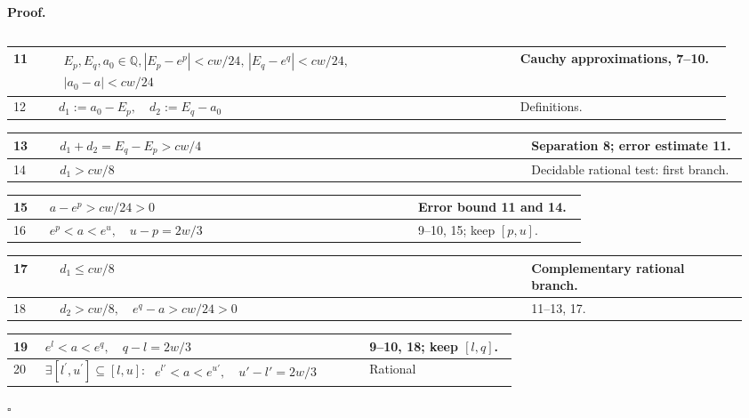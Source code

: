 \documentclass[11pt,reqno]{amsart}
\theoremstyle{redplain}
\renewcommand{\qedsymbol}{\textcolor{proofqed}{\ensuremath{\square}}}
\renewenvironment{proof}[1][Proof]{\par\noindent\textbf{\textcolor{proofhead}{#1.}}\par\nobreak}{\par\nobreak\hfill\qedsymbol}
\numberwithin{equation}{section}
\begin{document}
\begin{proof}
\begin{tabular}{|@{}p{0.06\linewidth}p{0.61\linewidth}p{0.29\linewidth}}
\end{tabular}%
\noindent \text{ \ }\newline
\noindent 
\begin{tabular}{|@{}p{0.06\linewidth}p{0.61\linewidth}p{0.29\linewidth}}
\hline
11 & $\begin{gathered}E_p,E_q,a_0\in\mathbb Q, |E_p-e^p|<cw/24,\,
|E_q-e^q|<cw/24,\,\\ |a_0-a|<cw/24\end{gathered}$ & Cauchy
approximations, 7--10. \\ \hline
12 & $d_1:=a_0-E_p,\quad d_2:=E_q-a_0$ & Definitions. \\ 
\end{tabular}%
\noindent \text{ \ }\newline
\noindent  
\begin{tabular}{|@{}p{0.06\linewidth}p{0.61\linewidth}p{0.29\linewidth}}
\hline
13 & $d_1+d_2=E_q-E_p>cw/4$ & Separation 8; error estimate
11. \\ \hline
14 & $d_1>cw/8$ & Decidable rational test: first branch. \\ 
\end{tabular}%
\noindent \text{ \ }\newline
\noindent 
\begin{tabular}{|@{}p{0.06\linewidth}p{0.61\linewidth}p{0.29\linewidth}}
\hline
15 & $a-e^p>cw/24>0$ & Error bound 11 and 14. \\ \hline
16 & $e^p<a<e^u,\quad u-p=2w/3$ & 9--10, 15; keep $[p,u]$. \\ 
\end{tabular}%
\noindent \text{ \ }\newline
\noindent 
\begin{tabular}{|@{}p{0.06\linewidth}p{0.61\linewidth}p{0.29\linewidth}}
\hline
17 & $d_1\le cw/8$ & Complementary rational branch. \\ \hline
18 & $d_2>cw/8,\quad e^q-a>cw/24>0$ & 11--13, 17. \\ 
\end{tabular}%
\noindent \text{ \ }\newline
\noindent 
\begin{tabular}{|@{}p{0.06\linewidth}p{0.61\linewidth}p{0.29\linewidth}}
\hline
19 & $e^l<a<e^q,\quad q-l=2w/3$ & 9--10, 18; keep $[l,q]$. \\ \hline
20 &  $\exists[l^{\prime },u^{\prime }]\subseteq[l,u]:\ %
\begin{gathered}e^{l'}<a<e^{u'},\quad u'-l'=2w/3\end{gathered}$ & Rational

\end{tabular}
\end{proof}
\end{document}
